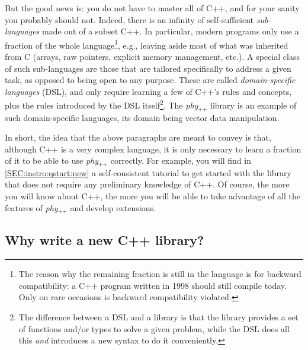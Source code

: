 \documentclass[12pt]{report}
\newcommand{\phypp}{\textit{phy}$_{\text{++}}$\xspace}
\begin{document}
But the good news is: you do not have to master all of C++, and for your sanity you probably should not. Indeed, there is an infinity of self-sufficient \emph{sub-languages} made out of a subset C++. In particular, modern programs only use a fraction of the whole language\footnote{The reason why the remaining fraction is still in the language is for backward compatibility: a C++ program written in 1998 should still compile today. Only on rare occasions is backward compatibility violated.}, e.g., leaving aside most of what was inherited from C (arrays, raw pointers, explicit memory management, etc.). A special class of such sub-languages are those that are tailored specifically to address a given task, as opposed to being open to any purpose. These are called \emph{domain-specific languages} (DSL), and only require learning a few of C++'s rules and concepts, plus the rules introduced by the DSL itself\footnote{The difference between a DSL and a library is that the library provides a set of functions and/or types to solve a given problem, while the DSL does all this \emph{and} introduces a new syntax to do it conveniently.}. The \phypp library is an example of such domain-specific languages, its domain being vector data manipulation.

In short, the idea that the above paragraphs are meant to convey is that, although C++ is a very complex language, it is only necessary to learn a fraction of it to be able to use \phypp correctly. For example, you will find in \ref{SEC:instro:qstart:new} a self-consistent tutorial to get started with the library that does not require any preliminary knowledge of C++. Of course, the more you will know about C++, the more you will be able to take advantage of all the features of \phypp and develop extensions.

\subsection{Why write a new C++ library?}
\end{document}
